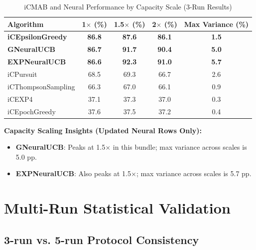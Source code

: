 \documentclass[12pt,a4paper]{article}
\newcommand{\primarytext}[1]{\textcolor{primaryblue}{\textbf{#1}}}
\newcommand{\legacy}[1]{\textcolor{legacycolor}{\textbf{#1}}}
\newcommand{\neural}[1]{\textcolor{neuralcolor}{\textbf{#1}}}
\begin{document}
\begin{table}[H]
\centering
\caption{iCMAB and Neural Performance by Capacity Scale (3-Run Results)}
\label{tab:capacity-scale}
\begin{tabular}{@{}lcccc@{}}
\toprule
\textbf{Algorithm} & \textbf{1$\times$ (\%)} & \textbf{1.5$\times$ (\%)} & \textbf{2$\times$ (\%)} & \textbf{Max Variance (\%)} \\
\midrule
\primarytext{iCEpsilonGreedy}   & \primarytext{86.8} & \primarytext{87.6} & \primarytext{86.1} & \primarytext{1.5} \\
\neural{GNeuralUCB}            & \neural{86.7} & \neural{91.7} & \neural{90.4} & \neural{5.0} \\
\legacy{EXPNeuralUCB}           & \legacy{86.6} & \legacy{92.3} & \legacy{91.0} & \legacy{5.7} \\
iCPursuit                       & 68.5 & 69.3 & 66.7 & 2.6 \\
iCThompsonSampling              & 66.3 & 67.0 & 66.1 & 0.9 \\
iCEXP4                          & 37.1 & 37.3 & 37.0 & 0.3 \\
iCEpochGreedy                   & 37.6 & 37.5 & 37.2 & 0.4 \\
\bottomrule
\end{tabular}
\end{table}

\textbf{Capacity Scaling Insights (Updated Neural Rows Only):}
\begin{itemize}
\item \neural{GNeuralUCB}: Peaks at 1.5$\times$ in this bundle; max variance across scales is 5.0 pp.
\item \legacy{EXPNeuralUCB}: Also peaks at 1.5$\times$; max variance across scales is 5.7 pp.
\end{itemize}

\section{Multi-Run Statistical Validation}

\subsection{3-run vs. 5-run Protocol Consistency}
\end{document}
